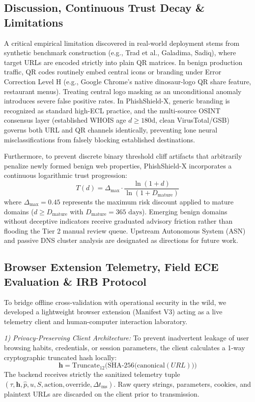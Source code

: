 \documentclass[conference]{IEEEtran}
\begin{document}
\subsection{Discussion, Continuous Trust Decay \& Limitations}
A critical empirical limitation discovered in real-world deployment stems from synthetic benchmark construction (e.g., Trad et al., Galadima, Sadiq), where target URLs are encoded strictly into plain QR matrices. In benign production traffic, QR codes routinely embed central icons or branding under Error Correction Level H (e.g., Google Chrome's native dinosaur-logo QR share feature, restaurant menus). Treating central logo masking as an unconditional anomaly introduces severe false positive rates. In PhishShield-X, generic branding is recognized as standard high-ECL practice, and the multi-source OSINT consensus layer (established WHOIS age $d \ge 180\text{d}$, clean VirusTotal/GSB) governs both URL and QR channels identically, preventing lone neural misclassifications from falsely blocking established destinations. 

Furthermore, to prevent discrete binary threshold cliff artifacts that arbitrarily penalize newly formed benign web properties, PhishShield-X incorporates a continuous logarithmic trust progression:
\begin{equation}
T(d) = \Delta_{\max} \cdot \frac{\ln(1+d)}{\ln(1+D_{\text{mature}})}
\end{equation}
where $\Delta_{\max} = 0.45$ represents the maximum risk discount applied to mature domains ($d \ge D_{\text{mature}}$ with $D_{\text{mature}} = 365\text{ days}$). Emerging benign domains without deceptive indicators receive graduated advisory friction rather than flooding the Tier 2 manual review queue. Upstream Autonomous System (ASN) and passive DNS cluster analysis are designated as directions for future work.

\subsection{Browser Extension Telemetry, Field ECE Evaluation \& IRB Protocol}
To bridge offline cross-validation with operational security in the wild, we developed a lightweight browser extension (Manifest V3) acting as a live telemetry client and human-computer interaction laboratory.

\textit{1) Privacy-Preserving Client Architecture:} To prevent inadvertent leakage of user browsing habits, credentials, or session parameters, the client calculates a 1-way cryptographic truncated hash locally:
\begin{equation}
\mathbf{h} = \text{Truncate}_{12}\Big(\text{SHA-256}\big(\text{canonical}(URL)\big)\Big)
\end{equation}
The backend receives strictly the sanitized telemetry tuple $(\tau, \mathbf{h}, \hat{p}, u, S, \text{action}, \text{override}, \Delta t_{\text{ms}})$. Raw query strings, parameters, cookies, and plaintext URLs are discarded on the client prior to transmission.
\end{document}
